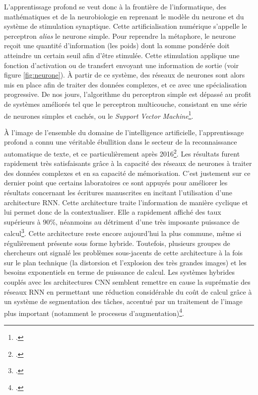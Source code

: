 	L'apprentissage profond se veut donc à la frontière de l'informatique, des mathématiques et de la neurobiologie en reprenant le modèle du neurone et du système de stimulation synaptique. Cette artificialisation numérique s'appelle le perceptron \textit{alias} le neurone simple. Pour reprendre la métaphore, le neurone reçoit une quantité d'information (les poids) dont la somme pondérée doit atteindre un certain seuil afin d'être stimulée. Cette stimulation applique une fonction d'activation ou de transfert envoyant une information de sortie (voir figure \ref{fig:neurone}). À partir de ce système, des réseaux de neurones sont alors mis en place afin de traiter des données complexes, et ce avec une spécialisation progressive. De nos jours, l'algorithme du perceptron simple est dépassé au profit de systèmes améliorés tel que le perceptron multicouche, consistant en une série de neurones simples et cachés, ou le \textit{Support Vector Machine}\footcite[Pour prolonger la curiosité, voici trois articles permettant d'expliquer certains principes généraux et des cas applicatifs:][]{nobleWhatSupportVector2006, gardnerArtificialNeuralNetworks1998, ramchounMultilayerPerceptronArchitecture2016}.
	
	À l'image de l'ensemble du domaine de l'intelligence artificielle, l'apprentissage profond a connu une véritable ébullition dans le secteur de la reconnaissance automatique de texte, et ce particulièrement après 2016\footcite{memonHandwrittenOpticalCharacter2020}. Les résultats furent rapidement très satisfaisants grâce à la capacité des réseaux de neurones à traiter des données complexes et en sa capacité de mémorisation. C'est justement sur ce dernier point que certains laboratoires ce sont appuyés pour améliorer les résultats concernant les écritures manuscrites en incitant l'utilisation d'une architecture \gls{RNN}. Cette architecture traite l'information de manière cyclique et lui permet donc de la contextualiser. Elle a rapidement affiché des taux supérieurs à 90\%, néanmoins au détriment d'une très imposante puissance de calcul\footcite{gravesOfflineHandwritingRecognition2008}. Cette architecture reste encore aujourd'hui la plus commune, même si régulièrement présente sous forme hybride. Toutefois, plusieurs groupes de chercheurs ont signalé les problèmes sous-jacents de cette architecture à la fois sur le plan technique (la distorsion et l'explosion des très grandes images) et les besoins exponentiels en terme de puissance de calcul. Les systèmes hybrides couplés avec les architectures \gls{CNN} semblent remettre en cause la suprématie des réseaux RNN en permettant une réduction considérable du coût de calcul grâce à un système de segmentation des tâches, accentué par un traitement de l'image plus important (notamment le processus d'augmentation)\footcite{puigcerverAreMultidimensionalRecurrent2017, desousanetoHTRFlorDeepLearning2020}.
	
